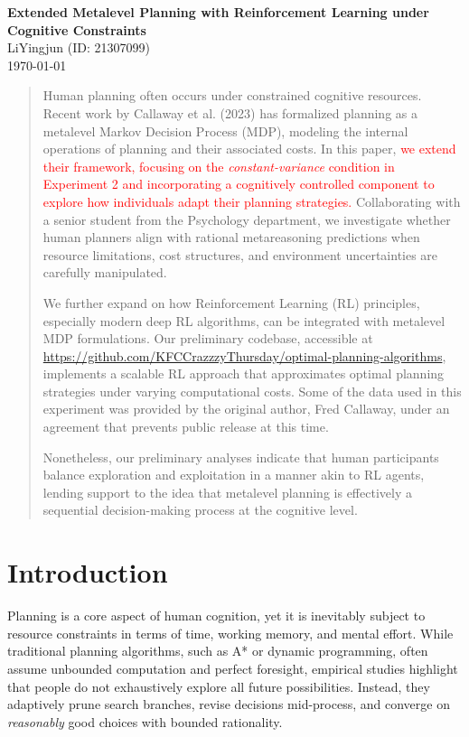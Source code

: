 \documentclass[a4paper,12pt,oneside,article]{memoir}
\begin{document}
\begin{center}
    \Large \textbf{Extended Metalevel Planning with Reinforcement Learning under Cognitive Constraints} \\
    \vspace{0.2cm}
    \large LiYingjun (ID: 21307099) \\
    \today
\end{center}

\begin{abstract}
Human planning often occurs under constrained cognitive resources.
 Recent work by Callaway et al. (2023) \textcolor{red}{\cite{Callaway2023rationaluse}} has formalized planning as a metalevel
 Markov Decision Process (MDP),
  modeling the internal operations of planning and their associated costs.
   In this paper, \textcolor{red}{we extend their framework, focusing on the \emph{constant-variance} condition in Experiment 2 and 
   incorporating a cognitively controlled component to explore how individuals adapt their planning strategies.} Collaborating with a senior student from the Psychology department, we investigate whether human planners align with rational metareasoning predictions when resource limitations, cost structures, and environment uncertainties are carefully manipulated.

We further expand on how Reinforcement Learning (RL) principles, 
especially modern deep RL algorithms, can be integrated with metalevel MDP formulations. 
Our preliminary codebase, accessible at 
\url{https://github.com/KFCCrazzzyThursday/optimal-planning-algorithms}, 
implements a scalable RL approach that approximates optimal 
planning strategies under varying computational costs. 
Some of the data used in this experiment was provided by the original author, 
Fred Callaway, under an agreement that prevents public release at this time. 

Nonetheless, our preliminary analyses indicate that human participants balance exploration and exploitation in a manner akin to RL agents, lending support to the idea that metalevel planning is effectively a sequential decision-making process at the cognitive level.

\end{abstract}
\newpage

\section*{Introduction}
Planning is a core aspect of human cognition, yet it is inevitably subject to resource constraints in terms of time, working memory, and mental effort. While traditional planning algorithms, such as A* or dynamic programming, often assume unbounded computation and perfect foresight, empirical studies highlight that people do not exhaustively explore all future possibilities. Instead, they adaptively prune search branches, revise decisions mid-process, and converge on \emph{reasonably} good choices with bounded rationality.
\end{document}
